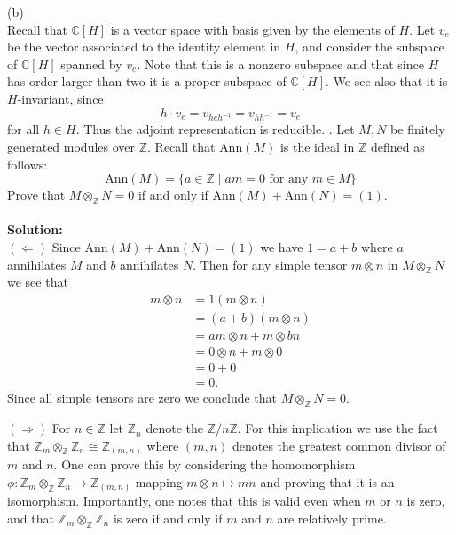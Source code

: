 \documentclass[11pt]{article}
\newcommand{\Z}{\mathbb{Z}}
\newcommand{\C}{\mathbb{C}}
\begin{document}
(b)\\
Recall that $\C[H]$ is a vector space with basis given by the elements of $H$. Let $v_e$ be the vector associated to the identity element in $H$, and consider the subspace of $\C[H]$ spanned by $v_e$. Note that this is a nonzero subspace and that since $H$ has order larger than two it is a proper subspace of $\C[H]$. We see also that it is $H$-invariant, since \[
h\cdot v_e = v_{heh^{-1}} = v_{hh^{-1}} = v_e
\]
for all $h\in H$. Thus the adjoint representation is reducible. 
. Let $M, N$ be finitely generated modules over $\Z$. Recall that $\mbox{Ann}(M)$ is the ideal in $\Z$
defined as follows:
\[
\mbox{Ann}(M) = \{a\in \Z \mid am = 0 \text{ for any } m\in M\}
\]
Prove that $M \otimes_\Z  N = 0$ if and only if $\mbox{Ann}(M) + \mbox{Ann}(N) = (1)$.\\\\
\textbf{Solution:}\\
$(\Leftarrow)$ Since $\mbox{Ann}(M) + \mbox{Ann}(N) = (1)$ we have $1 = a+b$ where $a$ annihilates $M$ and $b$ annihilates $N$. Then for any simple tensor $m\otimes n$ in $M\otimes_\Z N$ we see that \begin{align*}
m\otimes n & = 1(m\otimes n)\\
& = (a+b)(m\otimes n)\\
& = am\otimes n + m\otimes bn\\
& = 0\otimes n + m\otimes 0\\
& = 0+0\\
& = 0.
\end{align*}
Since all simple tensors are zero we conclude that $M\otimes_\Z N = 0$. 

$(\Rightarrow)$ For $n\in \Z$ let $\Z_n$ denote the $\Z/n\Z$. For this implication we use the fact that $\Z_m\otimes_\Z \Z_n \cong \Z_{(m,n)}$ where $(m,n)$ denotes the greatest common divisor of $m$ and $n$. One can prove this by considering the homomorphism $\phi:\Z_m\otimes_\Z \Z_n \to \Z_{(m,n)}$ mapping $m\otimes n \mapsto mn$ and proving that it is an isomorphism. Importantly, one notes that this is valid even when $m$ or $n$ is zero, and that $\Z_m\otimes_\Z \Z_n$ is zero if and only if $m$ and $n$ are relatively prime. 
\end{document}
